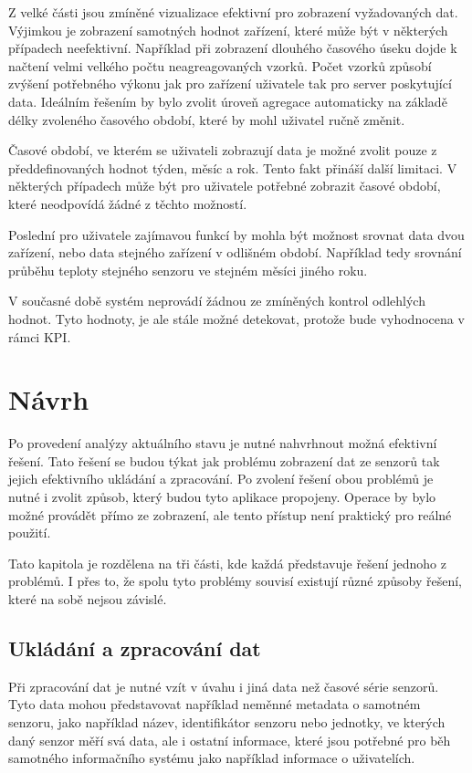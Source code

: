 Z velké části jsou zmíněné vizualizace efektivní pro zobrazení vyžadovaných dat. Výjimkou je zobrazení samotných hodnot zařízení, které může být v některých případech neefektivní. Například při zobrazení dlouhého časového úseku dojde k načtení velmi velkého počtu neagreagovaných vzorků. Počet vzorků způsobí zvýšení potřebného výkonu jak pro zařízení uživatele tak pro server poskytující data. Ideálním řešením by bylo zvolit úroveň agregace automaticky na základě délky zvoleného časového období, které by mohl uživatel ručně změnit.

Časové období, ve kterém se uživateli zobrazují data je možné zvolit pouze z předdefinovaných hodnot týden, měsíc a rok. Tento fakt přináší další limitaci. V některých případech může být pro uživatele potřebné zobrazit časové období, které neodpovídá žádné z těchto možností. 

Poslední pro uživatele zajímavou funkcí by mohla být možnost srovnat data dvou zařízení, nebo data stejného zařízení v odlišném období. Například tedy srovnání průběhu teploty stejného senzoru ve stejném měsíci jiného roku.

V současné době systém neprovádí žádnou ze zmíněných kontrol odlehlých hodnot. Tyto hodnoty, je ale stále možné detekovat, protože bude vyhodnocena v rámci KPI.

\chapter{Návrh}
\label{chapter_desing}
Po provedení analýzy aktuálního stavu je nutné nahvrhnout možná efektivní řešení. Tato řešení se budou týkat jak problému zobrazení dat ze senzorů tak jejich efektivního ukládání a zpracování. Po zvolení řešení obou problémů je nutné i zvolit způsob, který budou tyto aplikace propojeny. Operace by bylo možné provádět přímo ze zobrazení, ale tento přístup není praktický pro reálné použití.

Tato kapitola je rozdělena na tři části, kde každá představuje řešení jednoho z problémů. I přes to, že spolu tyto problémy souvisí existují různé způsoby řešení, které na sobě nejsou závislé.

\section{Ukládání a zpracování dat}
Při zpracování dat je nutné vzít v úvahu i jiná data než časové série senzorů. Tyto data mohou představovat například neměnné metadata o samotném senzoru, jako například název, identifikátor senzoru nebo jednotky, ve kterých daný senzor měří svá data, ale i ostatní informace, které jsou potřebné pro běh samotného informačního systému jako například informace o uživatelích. 

